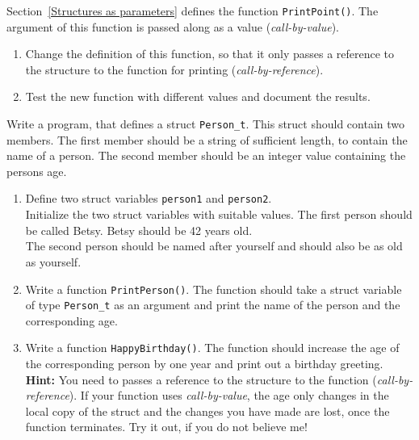 

\begin{exercise}

Section~\ref{Structures as parameters} defines the function {\tt PrintPoint()}. 
The argument of this function is passed along as a value (\emph{call-by-value}).

\begin{enumerate}
\item Change the definition of this function, so that it only passes a reference to 
the structure to the function for printing (\emph{call-by-reference}).

\item Test the new function with different values and document the results. 
\end{enumerate}


\end{exercise}



\begin{exercise}

Write a program, that defines a struct \texttt{Person\_t}.
This struct should contain two members. The first member should be a string
of sufficient length, to contain the name of a person. The second member should
be an integer value containing the persons age. 

\begin{enumerate}
\item Define two struct variables \texttt{person1} and \texttt{person2}.\\ 
Initialize the two struct variables with suitable values. The first person
should be called Betsy. Betsy should be 42 years old.\\
The second person should be named after yourself and should also be as old as yourself.


\item Write a function \texttt{PrintPerson()}. The function should take a struct variable of type
\texttt{Person\_t} as an argument and print the name of the person and the corresponding age.
\item Write a function \texttt{HappyBirthday()}. The function should increase the age of the 
corresponding person by one year and print out a birthday greeting.\\
\textbf{Hint: }You need to passes a reference to the structure to the function (\emph{call-by-reference}). 
If your function uses \emph{call-by-value}, the age only changes in the local copy of the struct and
the changes you have made are lost, once the function terminates. Try it out, if you do not believe me!
\end{enumerate}


\end{exercise}




